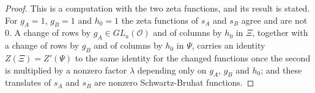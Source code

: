 \begin{proof}
This is a computation with the two zeta functions, and its result is stated.
For $g_A=1$, $g_B=1$ and $h_0=1$ the zeta functions of $s_A$ and $s_B$ agree
and are not $0$. A change of rows by $g_A\in GL_a(\mathcal O)$ and of columns
by $h_0$ in $\Xi$, together with a change of rows by $g_B$ and of columns by
$h_0$ in $\Psi$, carries an identity $Z(\Xi)=Z'(\Psi)$ to the same identity for
the changed functions once the second is multiplied by a nonzero factor
$\lambda$ depending only on $g_A$, $g_B$ and $h_0$; and these translates of
$s_A$ and $s_B$ are nonzero Schwartz-Bruhat functions.
\end{proof}

